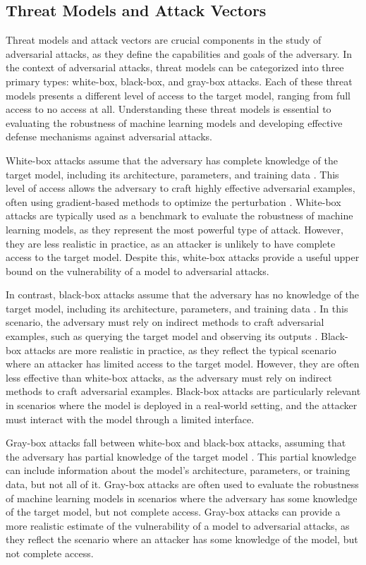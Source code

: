 \documentclass[11pt]{article}
\begin{document}
\subsection{Threat Models and Attack Vectors}

Threat models and attack vectors are crucial components in the study of adversarial attacks, as they define the capabilities and goals of the adversary. In the context of adversarial attacks, threat models can be categorized into three primary types: white-box, black-box, and gray-box attacks. Each of these threat models presents a different level of access to the target model, ranging from full access to no access at all. Understanding these threat models is essential to evaluating the robustness of machine learning models and developing effective defense mechanisms against adversarial attacks.

White-box attacks assume that the adversary has complete knowledge of the target model, including its architecture, parameters, and training data \cite{ref40}. This level of access allows the adversary to craft highly effective adversarial examples, often using gradient-based methods to optimize the perturbation \cite{ref41}. White-box attacks are typically used as a benchmark to evaluate the robustness of machine learning models, as they represent the most powerful type of attack. However, they are less realistic in practice, as an attacker is unlikely to have complete access to the target model. Despite this, white-box attacks provide a useful upper bound on the vulnerability of a model to adversarial attacks.

In contrast, black-box attacks assume that the adversary has no knowledge of the target model, including its architecture, parameters, and training data \cite{ref42}. In this scenario, the adversary must rely on indirect methods to craft adversarial examples, such as querying the target model and observing its outputs \cite{ref43}. Black-box attacks are more realistic in practice, as they reflect the typical scenario where an attacker has limited access to the target model. However, they are often less effective than white-box attacks, as the adversary must rely on indirect methods to craft adversarial examples. Black-box attacks are particularly relevant in scenarios where the model is deployed in a real-world setting, and the attacker must interact with the model through a limited interface.

Gray-box attacks fall between white-box and black-box attacks, assuming that the adversary has partial knowledge of the target model \cite{ref44}. This partial knowledge can include information about the model's architecture, parameters, or training data, but not all of it. Gray-box attacks are often used to evaluate the robustness of machine learning models in scenarios where the adversary has some knowledge of the target model, but not complete access. Gray-box attacks can provide a more realistic estimate of the vulnerability of a model to adversarial attacks, as they reflect the scenario where an attacker has some knowledge of the model, but not complete access.
\end{document}
